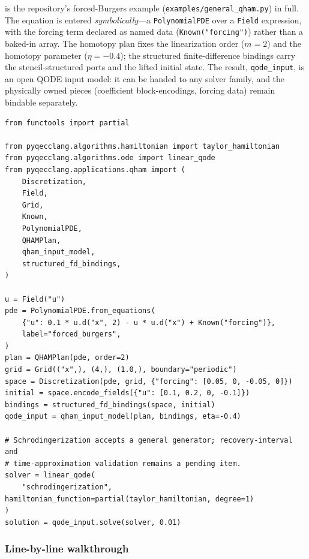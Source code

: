 is the repository's forced-Burgers example
(\texttt{examples/general\_qham.py}) in full.  The equation is entered
\emph{symbolically}---a \texttt{PolynomialPDE} over a \texttt{Field}
expression, with the forcing term declared as named data
(\texttt{Known("forcing")}) rather than a baked-in array.  The homotopy
plan fixes the linearization order ($m=2$) and the homotopy parameter
($\eta=-0.4$); the structured finite-difference bindings carry the
stencil-structured ports and the lifted initial state.  The result,
\texttt{qode\_input}, is an open QODE input model: it can be handed to any
solver family, and the physically owned pieces (coefficient block-encodings,
forcing data) remain bindable separately.

\begin{lstlisting}[style=pyqpython, caption={QHAM end to end: symbolic polynomial PDE, homotopy-analysis plan, structured discretization, and a solver handed in from outside (verbatim from the doctested example \texttt{examples/general\_qham.py}; comments translated).}, label={lst:qham}]
from functools import partial

from pyqecclang.algorithms.hamiltonian import taylor_hamiltonian
from pyqecclang.algorithms.ode import linear_qode
from pyqecclang.applications.qham import (
    Discretization,
    Field,
    Grid,
    Known,
    PolynomialPDE,
    QHAMPlan,
    qham_input_model,
    structured_fd_bindings,
)

u = Field("u")
pde = PolynomialPDE.from_equations(
    {"u": 0.1 * u.d("x", 2) - u * u.d("x") + Known("forcing")},
    label="forced_burgers",
)
plan = QHAMPlan(pde, order=2)
grid = Grid(("x",), (4,), (1.0,), boundary="periodic")
space = Discretization(pde, grid, {"forcing": [0.05, 0, -0.05, 0]})
initial = space.encode_fields({"u": [0.1, 0.2, 0, -0.1]})
bindings = structured_fd_bindings(space, initial)
qode_input = qham_input_model(plan, bindings, eta=-0.4)

# Schrodingerization accepts a general generator; recovery-interval and
# time-approximation validation remains a pending item.
solver = linear_qode(
    "schrodingerization", hamiltonian_function=partial(taylor_hamiltonian, degree=1)
)
solution = qode_input.solve(solver, 0.01)
\end{lstlisting}

\subsubsection{Line-by-line walkthrough}
\label{app:qham-lines}

